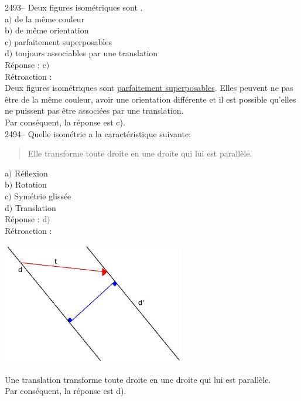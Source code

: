\documentclass[letterpaper, 12pt]{article}
\begin{document}
2493-- Deux figures isom\'etriques sont \underline{\qquad\qquad}. \\

a$)$  de la m\^eme couleur\\
b$)$  de m\^eme orientation\\
c$)$  parfaitement superposables\\
d$)$  toujours associables par une translation\\

R\'eponse : c$)$ \\

R\'etroaction :\\
Deux figures isom\'etriques sont \underline{parfaitement superposables}. Elles peuvent ne pas \^etre de la m\^eme couleur, avoir une orientation diff\'erente et il est possible qu'elles ne puissent pas \^etre associ\'ees par une translation. \\
Par cons\'equent, la r\'eponse est c).\\

2494-- Quelle isom\'etrie a la caract\'eristique suivante:
\begin{quote}
 \og Elle transforme toute droite en une droite qui lui est parall\`ele.\fg\\
\end{quote}

a$)$  R\'eflexion \\
b$)$  Rotation\\
c$)$  Sym\'etrie gliss\'ee\\
d$)$  Translation \\

R\'eponse : d$)$ \\

R\'etroaction :\\
\begin{center}
 \includegraphics[width=8cm,bb=14 14 828 522]{Q2494.eps}
\end{center}
Une translation transforme toute droite en une droite qui lui est parall\`ele. \\
Par cons\'equent, la r\'eponse est d).\\
\end{document}
